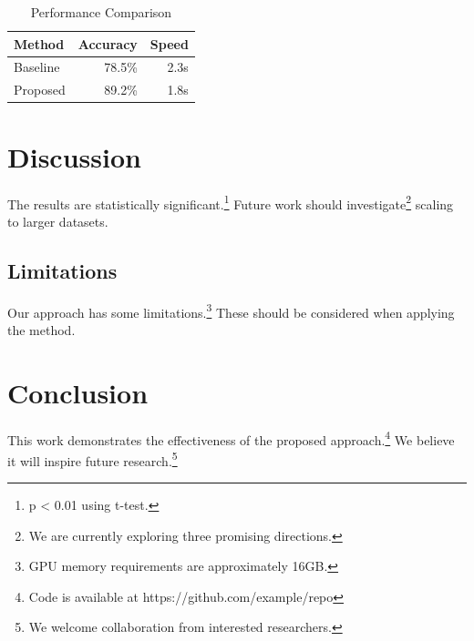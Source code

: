 \documentclass{article}
\begin{document}
\begin{table}[h]
\centering
\begin{tabular}{|l|r|r|}
\hline
Method & Accuracy & Speed \\
\hline
Baseline & 78.5\% & 2.3s \\
Proposed & 89.2\% & 1.8s \\
\hline
\end{tabular}
\caption{Performance Comparison}
\label{table:results}
\end{table}

\section{Discussion}

The results are statistically significant.\footnote{p < 0.01 using t-test.} Future work should investigate\footnote{We are currently exploring three promising directions.} scaling to larger datasets.

\subsection{Limitations}

Our approach has some limitations.\footnote{GPU memory requirements are approximately 16GB.} These should be considered when applying the method.

\section{Conclusion}

This work demonstrates the effectiveness of the proposed approach.\footnote{Code is available at https://github.com/example/repo} We believe it will inspire future research.\footnote{We welcome collaboration from interested researchers.}
\end{document}
